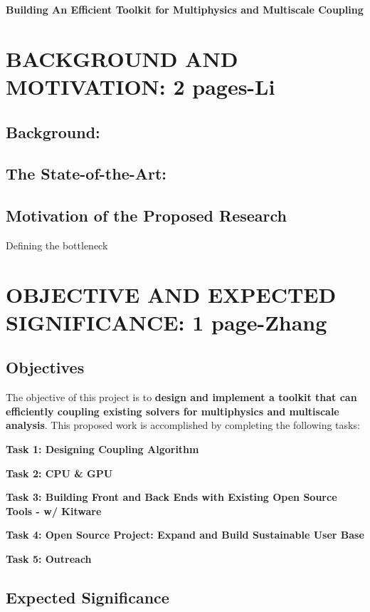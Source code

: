 \documentclass[12pt]{article}
\begin{document}
\begin{center}
 \LARGE\textbf{
Building An Efficient Toolkit for Multiphysics and Multiscale Coupling}
\end{center}

\tableofcontents
\newpage
\clearpage
%
\section{BACKGROUND AND MOTIVATION: 2 pages-Li }

\subsection{Background: }

\subsection{The State-of-the-Art: }


\subsection{Motivation of the Proposed Research}
Defining the bottleneck


\section{OBJECTIVE AND EXPECTED SIGNIFICANCE: 1 page-Zhang}

\subsection{Objectives}
The objective of this project is to \textbf{design and implement a toolkit that can efficiently coupling existing solvers for multiphysics and multiscale analysis}. This proposed work is accomplished by completing the following tasks:

\textbf{Task 1: Designing Coupling Algorithm} 

\textbf{Task 2: CPU \& GPU} 

\textbf{Task 3: Building Front and Back Ends with Existing Open Source Tools - w/ Kitware} 

\textbf{Task 4: Open Source Project: Expand and Build Sustainable User Base}

\textbf{Task 5: Outreach} 

\subsection{Expected Significance}
\end{document}
